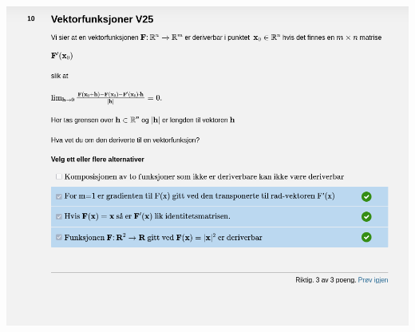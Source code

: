 \documentclass[12pt]{article}
\begin{document}
\newpage
\includegraphics[width=\textwidth]{Screenshot_20250521_135343.png}
\newpage
\end{document}
